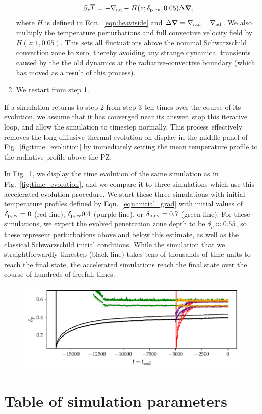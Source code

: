\documentclass{aastex631}
\newcommand{\gradrad}{\ensuremath{\nabla_{\rm{rad}}}}
\newcommand{\gradad}{\ensuremath{\nabla_{\rm{ad}}}}
\renewcommand{\vec}[1]{\boldsymbol{#1}}
\newcommand{\grad}{\vec{\nabla}}
\begin{document}
\begin{enumerate}
\begin{equation}
\partial_z \overline{T} = -\gradad - H(z; \delta_{\rm{p,ev}}, 0.05) \Delta\grad,
\label{eqn:initial_grad}
\end{equation}
where $H$ is defined in Eqn.~\ref{eqn:heaviside} and $\Delta\grad = \gradrad - \gradad$.
We also multiply the temperature perturbations and full convective velocity field by $H(z; 1, 0.05)$.
This sets all fluctuations above the nominal Schwarzschild convection zone to zero, thereby avoiding any strange dynamical transients caused by the the old dynamics at the radiative-convective boundary (which has moved as a result of this process).
\item We restart from step 1.
\end{enumerate}
If a simulation returns to step 2 from step 3 ten times over the course of its evolution, we assume that it has converged near its answer, stop this iterative loop, and allow the simulation to timestep normally.
This process effectively removes the long diffusive thermal evolution on display in the middle panel of Fig.~\ref{fig:time_evolution} by immediately setting the mean temperature profile to the radiative profile above the PZ.

In Fig.~\ref{fig:AE_time_figure}, we display the time evolution of the same simulation as in Fig.~\ref{fig:time_evolution}, and we compare it to three simulations which use this accelerated evolution procedure.
We start these three simulations with initial temperature profiles defined by Eqn.~\ref{eqn:initial_grad} with initial values of $\delta_{\rm{p,ev}} = 0$ (red line), $\delta_{\rm{p,ev}} 0.4$ (purple line), or $\delta_{\rm{p,ev}} = 0.7$ (green line).
For these simulations, we expect the evolved penetration zone depth to be $\delta_p \approx 0.55$, so these represent perturbations above and below this estimate, as well as the classical Schwarzschild initial conditions.
While the simulation that we straightforwardly timestep (black line) takes tens of thousands of time units to reach the final state, the accelerated simulations reach the final state over the course of hundreds of freefall times.

\begin{figure}[t!]
\centering
\includegraphics[width=\textwidth]{AE_time_figure.pdf}
\caption{
\label{fig:AE_time_figure}
}
\end{figure}



\section{Table of simulation parameters}
\label{app:simulation_table}







\end{document}
